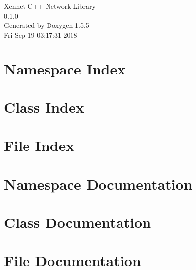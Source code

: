 \documentclass[a4paper]{book}
\begin{document}
\begin{titlepage}
\vspace*{7cm}
\begin{center}
{\Large Xennet C++ Network Library \\[1ex]\large 0.1.0 }\\
\vspace*{1cm}
{\large Generated by Doxygen 1.5.5}\\
\vspace*{0.5cm}
{\small Fri Sep 19 03:17:31 2008}\\
\end{center}
\end{titlepage}
\clearemptydoublepage
{}
\tableofcontents
\clearemptydoublepage
{}
\chapter{Namespace Index}

\chapter{Class Index}

\chapter{File Index}

\chapter{Namespace Documentation}

\chapter{Class Documentation}






\chapter{File Documentation}



















\printindex
\end{document}
